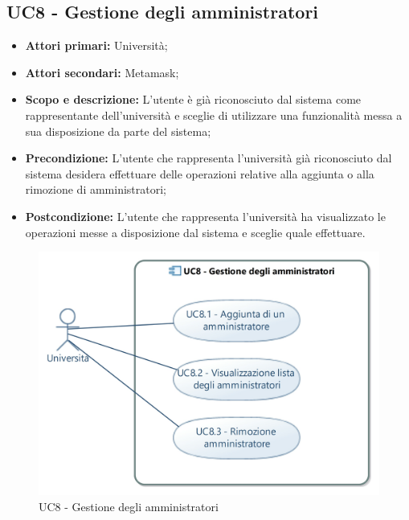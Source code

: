 \documentclass[AnalisiDeiRequisiti.tex]{subfiles}
\begin{document}
\subsection{UC8 - Gestione degli amministratori}
\begin{itemize}
	\item \textbf{Attori primari:} Università;\\
	\item \textbf{Attori secondari:} Metamask;
	\item \textbf{Scopo e descrizione:} L'utente è già riconosciuto dal sistema come rappresentante dell'università e sceglie di utilizzare una funzionalità messa a sua disposizione da parte del sistema;\\
	\item \textbf{Precondizione:} L'utente che rappresenta l'università già riconosciuto dal sistema desidera effettuare delle operazioni relative alla aggiunta o alla rimozione di amministratori;\\
	\item \textbf{Postcondizione:} L'utente che rappresenta l'università ha visualizzato le operazioni messe a disposizione dal sistema e sceglie quale effettuare.\\
\end{itemize}

\begin{figure}[H]
	\centering
	\includegraphics[width=1.0\linewidth]{UC8.jpg}
	\caption{UC8 - Gestione degli amministratori}
	\label{fig:UC8 - Gestione degli amministratori}
\end{figure}
\end{document}
